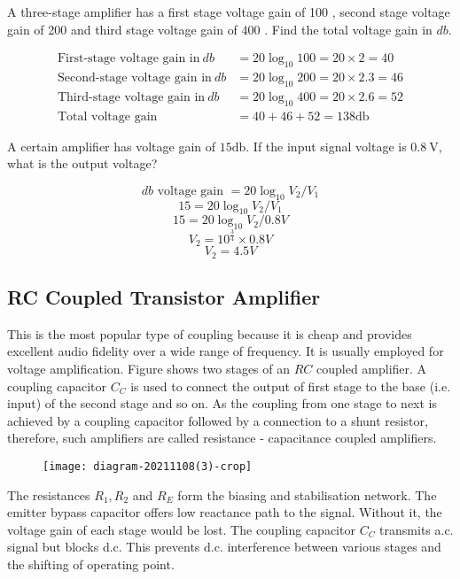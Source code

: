  \begin{exercise}
  A three-stage amplifier has a first stage voltage gain of 100 , second stage voltage gain of 200 and third stage voltage gain of 400 . Find the total voltage gain in $d b$.
 \end{exercise}
\begin{answer}
	\begin{align*}
\text{First-stage voltage gain in} \ d b&=20 \log _{10} 100=20 \times 2=40\\
\text{Second-stage voltage gain in} \ d b&=20 \log _{10} 200=20 \times 2.3=46\\
\text{Third-stage voltage gain in}\ d b&=20 \log _{10} 400=20 \times 2.6=52\\
\text{Total voltage gain}\ &=40+46+52=138 \mathrm{db}
	\end{align*}
	
\end{answer}
\begin{exercise}
 A certain amplifier has voltage gain of $15 \mathrm{db}$. If the input signal voltage is $0.8 \mathrm{~V}$, what is the output voltage?
\end{exercise}
\begin{answer}
	 $$ d b \text { voltage gain } =20 \log _{10} V_{2} / V_{1}$$ 
	 $$15 =20 \log _{10} V_{2} / V_{1}$$ 
	 $$15 =20 \log _{10} V_{2} / 0.8V$$ 
	 $$V_2=10^{\frac{3}{4}}\times 0.8V$$
	 $$V_2=4.5V$$
\end{answer}
\subsection{RC Coupled Transistor Amplifier}
This is the most popular type of coupling because it is cheap and provides excellent audio fidelity over a wide range of frequency. It is usually employed for voltage amplification. Figure shows two stages of an $R C$ coupled amplifier. A coupling capacitor $C_{C}$ is used to connect the output of first stage to the base (i.e. input) of the second stage and so on. As the coupling from one stage to next is achieved by a coupling capacitor followed by a connection to a shunt resistor, therefore, such amplifiers are called resistance - capacitance coupled amplifiers.\\
\begin{figure}[H]
	\centering
	\texttt{[image: diagram-20211108(3)-crop]}
	\caption{}
	\label{}
\end{figure}
The resistances $R_{1}, R_{2}$ and $R_{E}$ form the biasing and stabilisation network. The emitter bypass capacitor offers low reactance path to the signal. Without it, the voltage gain of each stage would be lost. The coupling capacitor $C_{C}$ transmits a.c. signal but blocks d.c. This prevents d.c. interference between various stages and the shifting of operating point.\\
